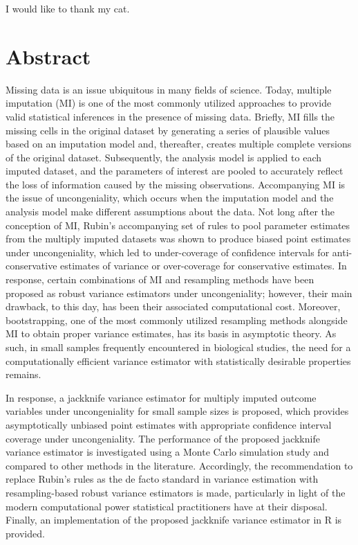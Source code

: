 \documentclass[
  letterpaper,
  DIV=11,
  numbers=noendperiod]{scrreprt}
\begin{document}
I would like to thank my cat.


\hypertarget{abstract}{%
\chapter{Abstract}\label{abstract}}

Missing data is an issue ubiquitous in many fields of science. Today,
multiple imputation (MI) is one of the most commonly utilized approaches
to provide valid statistical inferences in the presence of missing data.
Briefly, MI fills the missing cells in the original dataset by
generating a series of plausible values based on an imputation model
and, thereafter, creates multiple complete versions of the original
dataset. Subsequently, the analysis model is applied to each imputed
dataset, and the parameters of interest are pooled to accurately reflect
the loss of information caused by the missing observations. Accompanying
MI is the issue of uncongeniality, which occurs when the imputation
model and the analysis model make different assumptions about the data.
Not long after the conception of MI, Rubin's accompanying set of rules
to pool parameter estimates from the multiply imputed datasets was shown
to produce biased point estimates under uncongeniality, which led to
under-coverage of confidence intervals for anti-conservative estimates
of variance or over-coverage for conservative estimates. In response,
certain combinations of MI and resampling methods have been proposed as
robust variance estimators under uncongeniality; however, their main
drawback, to this day, has been their associated computational cost.
Moreover, bootstrapping, one of the most commonly utilized resampling
methods alongside MI to obtain proper variance estimates, has its basis
in asymptotic theory. As such, in small samples frequently encountered
in biological studies, the need for a computationally efficient variance
estimator with statistically desirable properties remains.

In response, a jackknife variance estimator for multiply imputed outcome
variables under uncongeniality for small sample sizes is proposed, which
provides asymptotically unbiased point estimates with appropriate
confidence interval coverage under uncongeniality. The performance of
the proposed jackknife variance estimator is investigated using a Monte
Carlo simulation study and compared to other methods in the literature.
Accordingly, the recommendation to replace Rubin's rules as the de facto
standard in variance estimation with resampling-based robust variance
estimators is made, particularly in light of the modern computational
power statistical practitioners have at their disposal. Finally, an
implementation of the proposed jackknife variance estimator in R is
provided.
\end{document}
